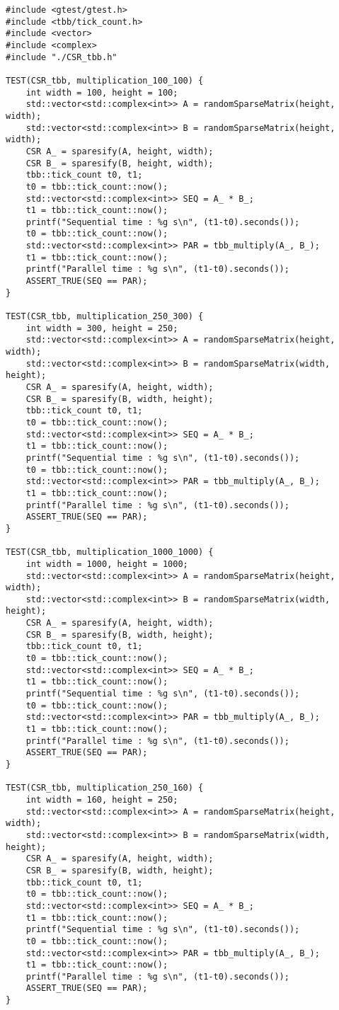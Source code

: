 \documentclass{report}
\begin{document}
\begin{lstlisting}
#include <gtest/gtest.h>
#include <tbb/tick_count.h>
#include <vector>
#include <complex>
#include "./CSR_tbb.h"

TEST(CSR_tbb, multiplication_100_100) {
    int width = 100, height = 100;
    std::vector<std::complex<int>> A = randomSparseMatrix(height, width);
    std::vector<std::complex<int>> B = randomSparseMatrix(height, width);
    CSR A_ = sparesify(A, height, width);
    CSR B_ = sparesify(B, height, width);
    tbb::tick_count t0, t1;
    t0 = tbb::tick_count::now();
    std::vector<std::complex<int>> SEQ = A_ * B_;
    t1 = tbb::tick_count::now();
    printf("Sequential time : %g s\n", (t1-t0).seconds());
    t0 = tbb::tick_count::now();
    std::vector<std::complex<int>> PAR = tbb_multiply(A_, B_);
    t1 = tbb::tick_count::now();
    printf("Parallel time : %g s\n", (t1-t0).seconds());
    ASSERT_TRUE(SEQ == PAR);
}

TEST(CSR_tbb, multiplication_250_300) {
    int width = 300, height = 250;
    std::vector<std::complex<int>> A = randomSparseMatrix(height, width);
    std::vector<std::complex<int>> B = randomSparseMatrix(width, height);
    CSR A_ = sparesify(A, height, width);
    CSR B_ = sparesify(B, width, height);
    tbb::tick_count t0, t1;
    t0 = tbb::tick_count::now();
    std::vector<std::complex<int>> SEQ = A_ * B_;
    t1 = tbb::tick_count::now();
    printf("Sequential time : %g s\n", (t1-t0).seconds());
    t0 = tbb::tick_count::now();
    std::vector<std::complex<int>> PAR = tbb_multiply(A_, B_);
    t1 = tbb::tick_count::now();
    printf("Parallel time : %g s\n", (t1-t0).seconds());
    ASSERT_TRUE(SEQ == PAR);
}

TEST(CSR_tbb, multiplication_1000_1000) {
    int width = 1000, height = 1000;
    std::vector<std::complex<int>> A = randomSparseMatrix(height, width);
    std::vector<std::complex<int>> B = randomSparseMatrix(width, height);
    CSR A_ = sparesify(A, height, width);
    CSR B_ = sparesify(B, width, height);
    tbb::tick_count t0, t1;
    t0 = tbb::tick_count::now();
    std::vector<std::complex<int>> SEQ = A_ * B_;
    t1 = tbb::tick_count::now();
    printf("Sequential time : %g s\n", (t1-t0).seconds());
    t0 = tbb::tick_count::now();
    std::vector<std::complex<int>> PAR = tbb_multiply(A_, B_);
    t1 = tbb::tick_count::now();
    printf("Parallel time : %g s\n", (t1-t0).seconds());
    ASSERT_TRUE(SEQ == PAR);
}

TEST(CSR_tbb, multiplication_250_160) {
    int width = 160, height = 250;
    std::vector<std::complex<int>> A = randomSparseMatrix(height, width);
    std::vector<std::complex<int>> B = randomSparseMatrix(width, height);
    CSR A_ = sparesify(A, height, width);
    CSR B_ = sparesify(B, width, height);
    tbb::tick_count t0, t1;
    t0 = tbb::tick_count::now();
    std::vector<std::complex<int>> SEQ = A_ * B_;
    t1 = tbb::tick_count::now();
    printf("Sequential time : %g s\n", (t1-t0).seconds());
    t0 = tbb::tick_count::now();
    std::vector<std::complex<int>> PAR = tbb_multiply(A_, B_);
    t1 = tbb::tick_count::now();
    printf("Parallel time : %g s\n", (t1-t0).seconds());
    ASSERT_TRUE(SEQ == PAR);
}


\end{lstlisting}
\end{document}
